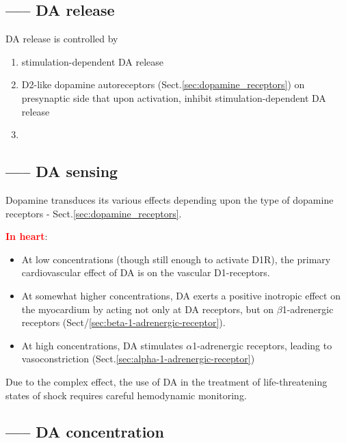 \subsection{----- DA release}

DA release is controlled by
\begin{enumerate}
  \item stimulation-dependent DA release
  
  \item D2-like dopamine autoreceptors (Sect.\ref{sec:dopamine_receptors}) on
  presynaptic side that upon activation, inhibit stimulation-dependent DA release
  
  \item 
\end{enumerate}

\subsection{----- DA sensing}
\label{sec:dopamine-theurapeutic-role}

Dopamine transduces its various effects depending upon the type of dopamine
receptors - Sect.\ref{sec:dopamine_receptors}.

\textcolor{red}{\bf In heart}:
\begin{itemize}
  \item At low concentrations (though still enough to activate D1R), the primary
cardiovascular effect of DA is on the vascular D1-receptors. 

  \item At somewhat higher concentrations, DA exerts a positive inotropic effect
  on the myocardium by acting not only at DA receptors, but on $\beta$1-adrenergic
receptors (Sect/\ref{sec:beta-1-adrenergic-receptor}).

  \item At high concentrations, DA stimulates $\alpha$1-adrenergic receptors,
  leading to vasoconstriction (Sect.\ref{sec:alpha-1-adrenergic-receptor})
\end{itemize}
Due to the complex effect, the use of DA in the treatment of life-threatening
states of shock requires careful hemodynamic monitoring.





\subsection{----- DA concentration}

